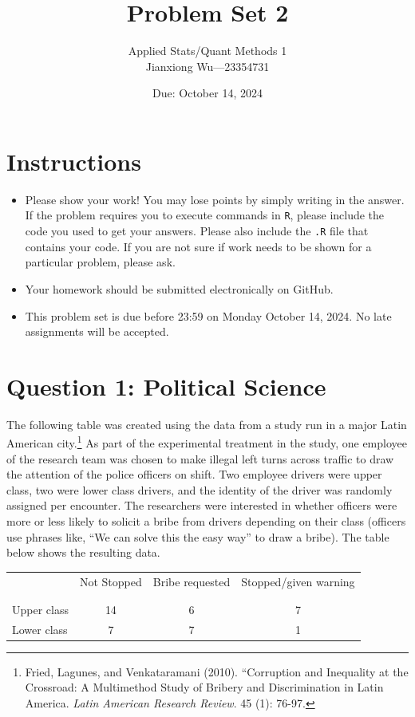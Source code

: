 \documentclass[12pt,letterpaper]{article}
\title{Problem Set 2}
\date{Due: October 14, 2024}
\author{Applied Stats/Quant Methods 1
\\ Jianxiong Wu---23354731}
\begin{document}
	\maketitle
	\section*{Instructions}
\begin{itemize}
	\item Please show your work! You may lose points by simply writing in the answer. If the problem requires you to execute commands in \texttt{R}, please include the code you used to get your answers. Please also include the \texttt{.R} file that contains your code. If you are not sure if work needs to be shown for a particular problem, please ask.
	\item Your homework should be submitted electronically on GitHub.
	\item This problem set is due before 23:59 on Monday October 14, 2024. No late assignments will be accepted.

\end{itemize}

	
	\vspace{.5cm}
	\section*{Question 1: Political Science}
		\vspace{.25cm}
	The following table was created using the data from a study run in a major Latin American city.\footnote{Fried, Lagunes, and Venkataramani (2010). ``Corruption and Inequality at the Crossroad: A Multimethod Study of Bribery and Discrimination in Latin America. \textit{Latin American Research Review}. 45 (1): 76-97.} As part of the experimental treatment in the study, one employee of the research team was chosen to make illegal left turns across traffic to draw the attention of the police officers on shift. Two employee drivers were upper class, two were lower class drivers, and the identity of the driver was randomly assigned per encounter. The researchers were interested in whether officers were more or less likely to solicit a bribe from drivers depending on their class (officers use phrases like, ``We can solve this the easy way'' to draw a bribe). The table below shows the resulting data.

\newpage
\begin{table}[h!]
	\centering
	\begin{tabular}{l | c c c }
		& Not Stopped & Bribe requested & Stopped/given warning \\
		\\[-1.8ex] 
		\hline \\[-1.8ex]
		Upper class & 14 & 6 & 7 \\
		Lower class & 7 & 7 & 1 \\
		\hline
	\end{tabular}
\end{table}
\end{document}
